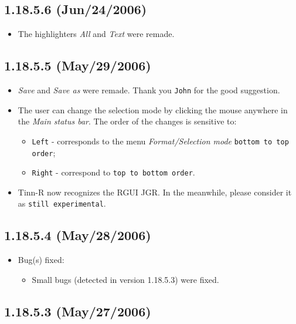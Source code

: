 \subsection{1.18.5.6 (Jun/24/2006)}

\begin{itemize}
  \item The highlighters \textit{All} and \textit{Text} were remade.
\end{itemize}


\subsection{1.18.5.5 (May/29/2006)}

\begin{itemize}
  \item \textit{Save} and \textit{Save as} were remade. Thank you
    \texttt{John} for the good suggestion.
  \item The user can change the selection mode by clicking the mouse
    anywhere in the \textit{Main status bar}. The order of the changes
    is sensitive to:
    \begin{itemize}
      \item \texttt{Left} - corresponds to the menu
        \textit{Format/Selection mode} \texttt{bottom to top order};
      \item \texttt{Right} - correspond to \texttt{top to bottom order}.
    \end{itemize}
  \item Tinn-R now recognizes the RGUI JGR. In the meanwhile, please consider
    it as \texttt{still experimental}.
\end{itemize}


\subsection{1.18.5.4 (May/28/2006)}

\begin{itemize}
  \item Bug(s) fixed:
    \begin{itemize}
      \item Small bugs (detected in version 1.18.5.3) were fixed.
    \end{itemize}
\end{itemize}


\subsection{1.18.5.3 (May/27/2006)}

